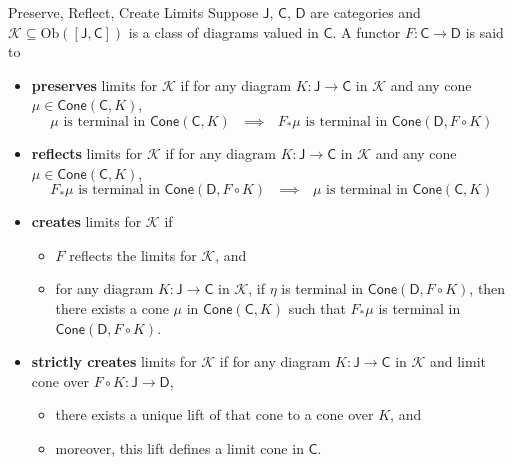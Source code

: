 \begin{definition}{Preserve, Reflect, Create Limits}{}
    Suppose $\mathsf{J}$, $\mathsf{C}$, $\mathsf{D}$ are categories and $\mathcal{K}\subseteq\mathrm{Ob}\left([\mathsf{J}, \mathsf{C}]\right)$ is a class of diagrams  valued in $\mathsf{C}$. A functor $F: \mathsf{C} \rightarrow \mathsf{D}$ is said to
    \begin{itemize}
        \item \textbf{preserves} limits for $\mathcal{K}$ if for any diagram $K: \mathsf{J} \rightarrow \mathsf{C}$ in $\mathcal{K}$ and any cone $\mu\in \mathsf{Cone}(\mathsf{C},K)$, 
        \[
        \text{$\mu$ is terminal in $\mathsf{Cone}(\mathsf{C},K)$ $\implies$ $F_*\mu$ is terminal in $\mathsf{Cone}(\mathsf{D},F\circ K)$}
        \]
        \item \textbf{reflects} limits for $\mathcal{K}$ if for any diagram $K: \mathsf{J} \rightarrow \mathsf{C}$ in $\mathcal{K}$ and any cone $\mu\in \mathsf{Cone}(\mathsf{C},K)$, 
        \[\text{$F_*\mu$ is terminal in $\mathsf{Cone}(\mathsf{D},F\circ K)$ $\implies$ $\mu$ is terminal in $\mathsf{Cone}(\mathsf{C},K)$}\]
        \item \textbf{creates} limits for $\mathcal{K}$ if 
        \begin{itemize}
            \item $F$ reflects the limits for $\mathcal{K}$, and
            \item for any diagram $K: \mathsf{J} \rightarrow \mathsf{C}$ in $\mathcal{K}$, if $\eta$ is terminal in $\mathsf{Cone}(\mathsf{D},F\circ K)$, then there exists a cone $\mu$ in $\mathsf{Cone}(\mathsf{C},K)$ such that $F_*\mu$ is terminal in $\mathsf{Cone}(\mathsf{D},F\circ K)$.
        \end{itemize}
        \item \textbf{strictly creates} limits for $\mathcal{K}$ if for any diagram $K: \mathsf{J} \rightarrow \mathsf{C}$ in $\mathcal{K}$ and limit cone over $F \circ K: \mathsf{J} \rightarrow \mathsf{D}$,
        \begin{itemize}
            \item there exists a unique lift of that cone to a cone over $K$, and
            \item moreover, this lift defines a limit cone in $\mathsf{C}$.
        \end{itemize}
    \end{itemize}
\end{definition}

